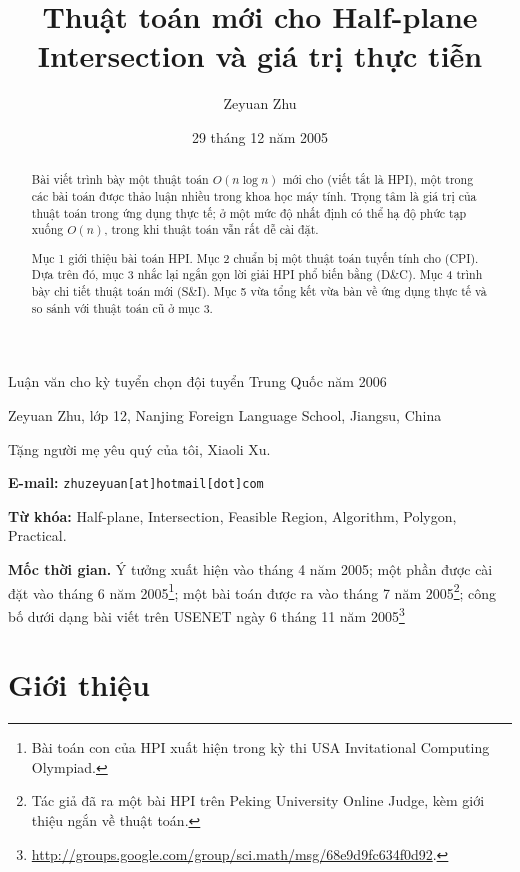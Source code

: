 \documentclass[11pt]{article}
\title{Thuật toán mới cho Half-plane Intersection và giá trị thực tiễn}
\author{Zeyuan Zhu}
\date{29 tháng 12 năm 2005}
\begin{document}
\maketitle


\begin{center}
  \small Luận văn cho kỳ tuyển chọn đội tuyển Trung Quốc năm 2006

  \smallskip
  Zeyuan Zhu, lớp 12, Nanjing Foreign Language School, Jiangsu, China

  \smallskip
  Tặng người mẹ yêu quý của tôi, Xiaoli Xu.
\end{center}

\noindent\textbf{E-mail:} \texttt{zhuzeyuan[at]hotmail[dot]com}

\noindent\textbf{Từ khóa:} Half-plane, Intersection, Feasible Region, Algorithm,
Polygon, Practical.

\renewcommand{\abstractname}{Tóm tắt}
\begin{abstract}
Bài viết trình bày một thuật toán \(O(n\log n)\) mới cho
 (viết tắt là HPI), một trong các bài toán được
thảo luận nhiều trong khoa học máy tính. Trọng tâm là giá trị của thuật toán
trong ứng dụng thực tế; ở một mức độ nhất định có thể hạ độ phức tạp xuống
\(O(n)\), trong khi thuật toán vẫn rất dễ cài đặt.

Mục 1 giới thiệu bài toán HPI. Mục 2 chuẩn bị một thuật toán tuyến tính cho
 (CPI). Dựa trên đó, mục 3 nhắc lại ngắn gọn
lời giải HPI phổ biến bằng  (D\&C). Mục 4 trình bày
chi tiết thuật toán mới  (S\&I). Mục 5 vừa tổng kết
vừa bàn về ứng dụng thực tế và so sánh với thuật toán cũ ở mục 3.
\end{abstract}

\noindent\textbf{Mốc thời gian.} Ý tưởng xuất hiện vào tháng 4 năm 2005; một
phần được cài đặt vào tháng 6 năm 2005\footnote{Bài toán con của HPI xuất hiện
trong kỳ thi USA Invitational Computing Olympiad.}; một bài toán được ra vào
tháng 7 năm 2005\footnote{Tác giả đã ra một bài HPI trên Peking University
Online Judge, kèm giới thiệu ngắn về thuật toán.}; công bố dưới dạng bài viết
trên USENET ngày 6 tháng 11 năm 2005\footnote{\url{http://groups.google.com/group/sci.math/msg/68e9d9fc634f0d92}.}

\section{Giới thiệu}
\end{document}
